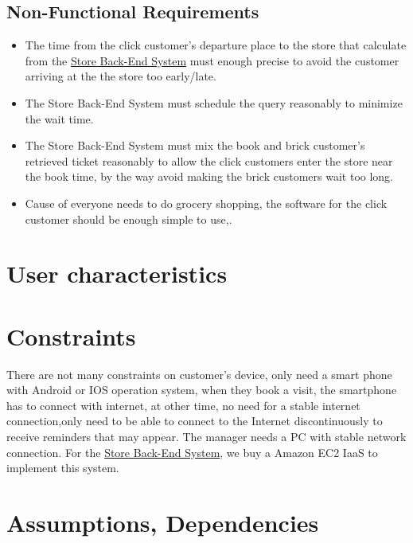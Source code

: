 \documentclass[a4paper,12pt]{book}
\begin{document}
\subsection{Non-Functional Requirements}
\begin{itemize}
	\item The time from the click customer's departure place to the store that calculate from the \hyperref[Definitions]{Store Back-End System} must enough precise to avoid the customer arriving at the the store too early/late.
	\item The Store Back-End System must schedule the query reasonably to minimize the wait time.
	\item The Store Back-End System must mix the book and brick customer's retrieved ticket reasonably to allow the click customers enter the store near the book time, by the way avoid making the brick customers wait too long.
	\item Cause of everyone needs to do grocery shopping, the software for the click customer should be enough simple to use,.
\end{itemize}

\section{User characteristics}

\section{Constraints}
There are not many constraints on customer's device, only need a smart phone with Android or IOS operation system, when they book a visit, the smartphone has to connect with internet, at other time, no need for a stable internet connection,only need to be able to connect to the Internet discontinuously to receive reminders that may appear.
The manager needs a PC with stable network connection.
For the \hyperref[Definitions]{Store Back-End System}, we buy a Amazon EC2 IaaS to implement this system.


\section{Assumptions, Dependencies}
\end{document}

